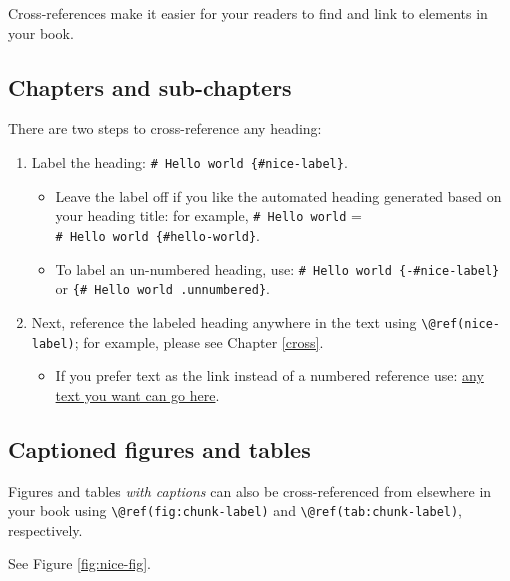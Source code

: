\documentclass[
]{book}
\providecommand{\tightlist}{%
  \setlength{\itemsep}{0pt}\setlength{\parskip}{0pt}}
\theoremstyle{definition}
\theoremstyle{definition}
\theoremstyle{definition}
\theoremstyle{definition}
\theoremstyle{remark}
\begin{document}
Cross-references make it easier for your readers to find and link to elements in your book.

\hypertarget{chapters-and-sub-chapters}{%
\subsection{Chapters and sub-chapters}\label{chapters-and-sub-chapters}}

There are two steps to cross-reference any heading:

\begin{enumerate}
\def\labelenumi{\arabic{enumi}.}
\tightlist
\item
  Label the heading: \texttt{\#\ Hello\ world\ \{\#nice-label\}}.

  \begin{itemize}
  \tightlist
  \item
    Leave the label off if you like the automated heading generated based on your heading title: for example, \texttt{\#\ Hello\ world} = \texttt{\#\ Hello\ world\ \{\#hello-world\}}.
  \item
    To label an un-numbered heading, use: \texttt{\#\ Hello\ world\ \{-\#nice-label\}} or \texttt{\{\#\ Hello\ world\ .unnumbered\}}.
  \end{itemize}
\item
  Next, reference the labeled heading anywhere in the text using \texttt{\textbackslash{}@ref(nice-label)}; for example, please see Chapter \ref{cross}.

  \begin{itemize}
  \tightlist
  \item
    If you prefer text as the link instead of a numbered reference use: \protect\hyperlink{cross}{any text you want can go here}.
  \end{itemize}
\end{enumerate}

\hypertarget{captioned-figures-and-tables}{%
\subsection{Captioned figures and tables}\label{captioned-figures-and-tables}}

Figures and tables \emph{with captions} can also be cross-referenced from elsewhere in your book using \texttt{\textbackslash{}@ref(fig:chunk-label)} and \texttt{\textbackslash{}@ref(tab:chunk-label)}, respectively.

See Figure \ref{fig:nice-fig}.
\end{document}
